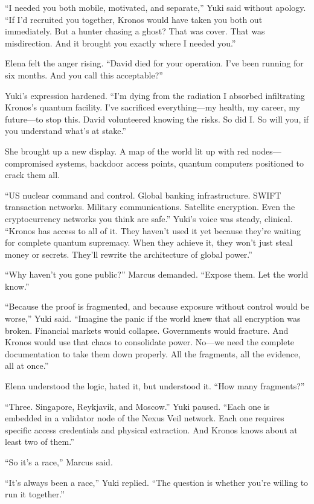 ``I needed you both mobile, motivated, and separate,'' Yuki said without
apology. ``If I'd recruited you together, Kronos would have taken you
both out immediately. But a hunter chasing a ghost? That was cover. That
was misdirection. And it brought you exactly where I needed you.''

Elena felt the anger rising. ``David died for your operation. I've been
running for six months. And you call this acceptable?''

Yuki's expression hardened. ``I'm dying from the radiation I absorbed
infiltrating Kronos's quantum facility. I've sacrificed everything---my
health, my career, my future---to stop this. David volunteered knowing
the risks. So did I. So will you, if you understand what's at stake.''

She brought up a new display. A map of the world lit up with red
nodes---compromised systems, backdoor access points, quantum computers
positioned to crack them all.

``US nuclear command and control. Global banking infrastructure. SWIFT
transaction networks. Military communications. Satellite encryption.
Even the cryptocurrency networks you think are safe.'' Yuki's voice was
steady, clinical. ``Kronos has access to all of it. They haven't used it
yet because they're waiting for complete quantum supremacy. When they
achieve it, they won't just steal money or secrets. They'll rewrite the
architecture of global power.''

``Why haven't you gone public?'' Marcus demanded. ``Expose them. Let the
world know.''

``Because the proof is fragmented, and because exposure without control
would be worse,'' Yuki said. ``Imagine the panic if the world knew that
all encryption was broken. Financial markets would collapse. Governments
would fracture. And Kronos would use that chaos to consolidate power.
No---we need the complete documentation to take them down properly. All
the fragments, all the evidence, all at once.''

Elena understood the logic, hated it, but understood it. ``How many
fragments?''

``Three. Singapore, Reykjavik, and Moscow.'' Yuki paused. ``Each one is
embedded in a validator node of the Nexus Veil network. Each one
requires specific access credentials and physical extraction. And Kronos
knows about at least two of them.''

``So it's a race,'' Marcus said.

``It's always been a race,'' Yuki replied. ``The question is whether
you're willing to run it together.''

